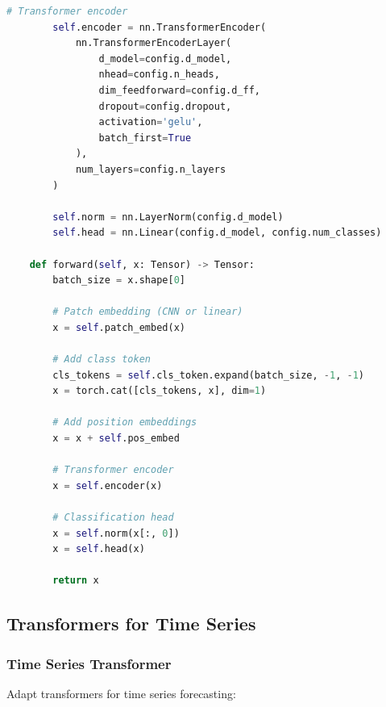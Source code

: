 \begin{lstlisting}[language=Python, caption=Hybrid CNN-Transformer]
        # Transformer encoder
        self.encoder = nn.TransformerEncoder(
            nn.TransformerEncoderLayer(
                d_model=config.d_model,
                nhead=config.n_heads,
                dim_feedforward=config.d_ff,
                dropout=config.dropout,
                activation='gelu',
                batch_first=True
            ),
            num_layers=config.n_layers
        )

        self.norm = nn.LayerNorm(config.d_model)
        self.head = nn.Linear(config.d_model, config.num_classes)

    def forward(self, x: Tensor) -> Tensor:
        batch_size = x.shape[0]

        # Patch embedding (CNN or linear)
        x = self.patch_embed(x)

        # Add class token
        cls_tokens = self.cls_token.expand(batch_size, -1, -1)
        x = torch.cat([cls_tokens, x], dim=1)

        # Add position embeddings
        x = x + self.pos_embed

        # Transformer encoder
        x = self.encoder(x)

        # Classification head
        x = self.norm(x[:, 0])
        x = self.head(x)

        return x
\end{lstlisting}

\subsection{Transformers for Time Series}

\subsubsection{Time Series Transformer}

Adapt transformers for time series forecasting:

